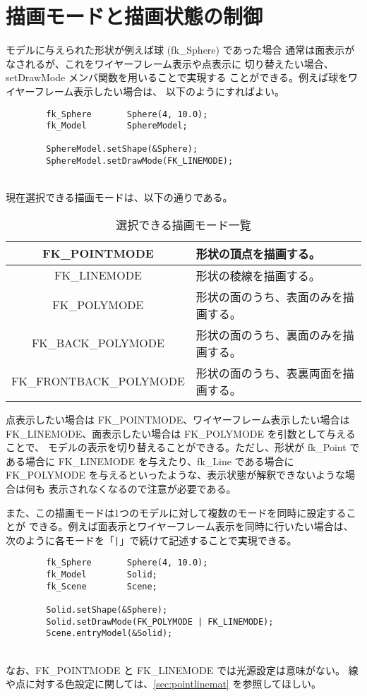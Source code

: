 \section{描画モードと描画状態の制御} \label{sec:drawmode}
モデルに与えられた形状が例えば球 (fk\_Sphere) であった場合
通常は面表示がなされるが、これをワイヤーフレーム表示や点表示に
切り替えたい場合、setDrawMode メンバ関数を用いることで実現する
ことができる。例えば球をワイヤーフレーム表示したい場合は、
以下のようにすればよい。
\\
\begin{breakbox}
\begin{verbatim}
        fk_Sphere       Sphere(4, 10.0);
        fk_Model        SphereModel;

        SphereModel.setShape(&Sphere);
        SphereModel.setDrawMode(FK_LINEMODE);
\end{verbatim}
\end{breakbox}
~ \\
現在選択できる描画モードは、以下の通りである。
\begin{table}[H]
\caption{選択できる描画モード一覧}
\label{tbl:drawmode}
\begin{center}
\begin{tabular}{|c|l|}
\hline
FK\_POINTMODE & 形状の頂点を描画する。\\ \hline
FK\_LINEMODE & 形状の稜線を描画する。\\ \hline
FK\_POLYMODE & 形状の面のうち、表面のみを描画する。\\ \hline
FK\_BACK\_POLYMODE & 形状の面のうち、裏面のみを描画する。\\ \hline
FK\_FRONTBACK\_POLYMODE & 形状の面のうち、表裏両面を描画する。\\ \hline
\end{tabular}
\end{center}
\end{table}

点表示したい場合は FK\_POINTMODE、ワイヤーフレーム表示したい場合は
FK\_LINEMODE、面表示したい場合は FK\_POLYMODE を引数として与えることで、
モデルの表示を切り替えることができる。ただし、形状が fk\_Point で
ある場合に FK\_LINEMODE を与えたり、fk\_Line である場合に FK\_POLYMODE
を与えるといったような、表示状態が解釈できないような場合は何も
表示されなくなるので注意が必要である。

また、この描画モードは1つのモデルに対して複数のモードを同時に設定することが
できる。例えば面表示とワイヤーフレーム表示を同時に行いたい場合は、
次のように各モードを「\verb+|+」で続けて記述することで実現できる。
\\
\begin{breakbox}
\begin{verbatim}
        fk_Sphere       Sphere(4, 10.0);
        fk_Model        Solid;
        fk_Scene        Scene;

        Solid.setShape(&Sphere);
        Solid.setDrawMode(FK_POLYMODE | FK_LINEMODE);
        Scene.entryModel(&Solid);
\end{verbatim}
\end{breakbox}
~ \\
なお、FK\_POINTMODE と FK\_LINEMODE では光源設定は意味がない。
線や点に対する色設定に関しては、\ref{sec:pointlinemat} を参照してほしい。

